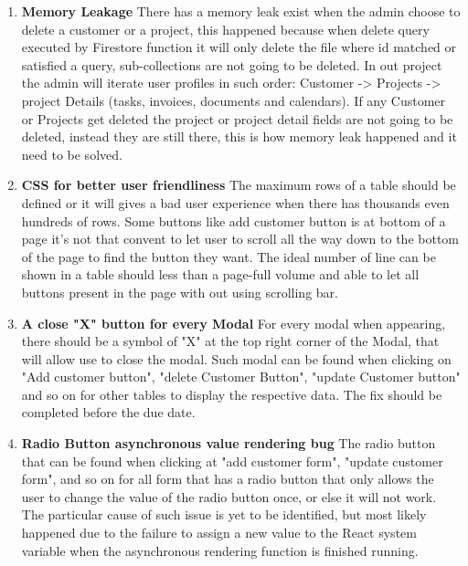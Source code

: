 \documentclass[onecolumn, draftclsnofoot,10pt, compsoc]{IEEEtran}
\begin{document}
\begin{enumerate}
  \item \textbf{Memory Leakage} \newline
  There has a memory leak exist when the admin choose to delete a customer or a project, this happened because when delete query executed by Firestore function it will only delete the file where id matched or satisfied a query, sub-collections are not going to be deleted. In out project the admin will iterate user profiles in such order: Customer -> Projects -> project Details (tasks, invoices, documents and calendars). If any Customer or Projects get deleted the project or project detail fields are not going to be deleted, instead they are still there, this is how memory leak happened and it need to be solved.\newline
  \item \textbf{CSS for better user friendliness} \newline
  The maximum rows of a table should be defined or it will gives a bad user experience when there has thousands even hundreds of rows. Some buttons like add customer button is at bottom of a page it's not that convent to let user to scroll all the way down to the bottom of the page to find the button they want. The ideal number of line can be shown in a table should  less than a page-full volume and able to let all buttons present in the page with out using scrolling bar.\newline
  \item \textbf{A close "X" button for every Modal}\newline
  For every modal when appearing, there should be a symbol of "X" at the top right corner of the Modal, that will allow use to close the modal. Such modal can be found when clicking on "Add customer button", "delete Customer Button", "update Customer button" and so on for other tables to display the respective data. The fix should be completed before the due date.  \newline
  
     \item \textbf{Radio Button asynchronous value rendering bug}\newline
     The radio button that can be found when clicking at "add customer form", "update customer form", and so on for all form that has a radio button that only allows the user to change the value of the radio button once, or else it will not work. The particular cause of such issue is yet to be identified, but most likely happened due to the failure to assign a new value to the React system variable when the asynchronous rendering function is finished running.\newline
  

\end{enumerate}
\end{document}
